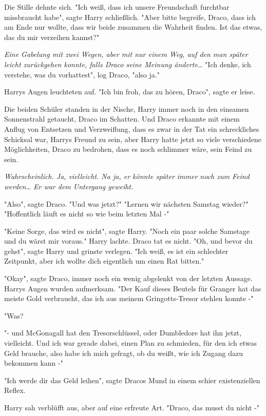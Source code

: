 {Die Stille dehnte sich. "Ich weiß, dass ich unsere Freundschaft furchtbar missbraucht habe", sagte Harry schließlich. "Aber bitte begreife, Draco, dass ich am Ende nur wollte, dass wir beide zusammen die Wahrheit finden. Ist das etwas, das du mir verzeihen kannst?"

\emph{Eine Gabelung mit zwei Wegen, aber mit nur einem Weg, auf den man später leicht zurückgehen konnte, falls Draco seine Meinung änderte…} "Ich denke, ich verstehe, was du vorhattest", log Draco, "also ja."

Harrys Augen leuchteten auf. "Ich bin froh, das zu hören, Draco", sagte er leise.

Die beiden Schüler standen in der Nische, Harry immer noch in den einsamen Sonnenstrahl getaucht, Draco im Schatten. Und Draco erkannte mit einem Anflug von Entsetzen und Verzweiflung, dass es zwar in der Tat ein schreckliches Schicksal war, Harrys Freund zu sein, aber Harry hatte jetzt so viele verschiedene Möglichkeiten, Draco zu bedrohen, dass es noch schlimmer wäre, sein Feind zu sein.

\emph{Wahrscheinlich. Ja, vielleicht. Na ja, er könnte später immer noch zum Feind werden… Er war dem Untergang geweiht.}

"Also", sagte Draco. "Und was jetzt?" "Lernen wir nächsten Samstag wieder?" "Hoffentlich läuft es nicht so wie beim letzten Mal -"

"Keine Sorge, das wird es nicht", sagte Harry. "Noch ein paar solche Samstage und du wärst mir voraus." Harry lachte. Draco tat es nicht. "Oh, und bevor du gehst", sagte Harry und grinste verlegen. "Ich weiß, es ist ein schlechter Zeitpunkt, aber ich wollte dich eigentlich um einen Rat bitten."

"Okay", sagte Draco, immer noch ein wenig abgelenkt von der letzten Aussage. Harrys Augen wurden aufmerksam. "Der Kauf dieses Beutels für Granger hat das meiste Gold verbraucht, das ich aus meinem Gringotts-Tresor stehlen konnte -"

"Was?

"- und McGonagall hat den Tresorschlüssel, oder Dumbledore hat ihn jetzt, vielleicht. Und ich war gerade dabei, einen Plan zu schmieden, für den ich etwas Geld brauche, also habe ich mich gefragt, ob du weißt, wie ich Zugang dazu bekommen kann -"

"Ich werde dir das Geld leihen", sagte Dracos Mund in einem schier existenziellen Reflex.

Harry sah verblüfft aus, aber auf eine erfreute Art. "Draco, das musst du nicht -"

}
